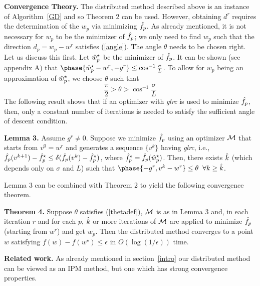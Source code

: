 {\bf Convergence Theory.} The distributed method described above is an instance of Algorithm~\ref{GD} and so Theorem 2 can be used. However, obtaining $d^r$ requires the determination of the $w_p$ via minimizing $\hat{f}_p$. As already mentioned, it is not necessary for $w_p$ to be the minimizer of $\hat{f}_p$; we only need to find $w_p$ such that the direction $d_p=w_p-w^r$ satisfies (\ref{angle}). The angle $\theta$ needs to be chosen right. Let us discuss this first. Let $\hat{w}_p^\star$ be the minimizer of $\hat{f}_p$. It can be shown (see appendix A) that $\phase{\what_p^\star-w^r,-g^r} \le \cos^{-1}\frac{\sigma}{L}$. To allow for $w_p$ being an approximation of $\hat{w}_p^\star$, we choose $\theta$ such that
\begin{equation}
\frac{\pi}{2} > \theta > \cos^{-1} \frac{\sigma}{L}
\label{thetadef}
\end{equation}
The following result shows that if an optimizer with {\it glrc} is used to minimize $\hat{f}_p$, then, only a constant number of iterations is needed to satisfy the sufficient angle of descent condition.

{\bf Lemma 3.} Assume $g^r\not=0$. Suppose we minimize $\hat{f}_p$ using an optimizer ${\cal M}$ that starts from $v^0=w^r$ and generates a sequence $\{v^k\}$ having {\it glrc}, i.e.,
$\hat{f}_p(v^{k+1}) - \hat{f}_p^\star \le \delta (\hat{f}_p(v^k) - \hat{f}_p^\star)$,
where $\hat{f}_p^\star = \hat{f}_p(\hat{w}_p^\star)$. Then, there exists $\hat{k}$ (which depends only on $\sigma$ and $L$) such that
$\phase{-g^r,v^k-w^r} \le \theta \;\; \forall k\ge \khat$.

Lemma 3 can be combined with Theorem 2 to yield the following convergence theorem.

{\bf Theorem 4.} Suppose $\theta$ satisfies (\ref{thetadef}), ${\cal M}$ is as in Lemma 3 and, in each iteration $r$ and for each $p$, $\hat{k}$ or more iterations of ${\cal M}$ are applied to minimize $\hat{f}_p$ (starting from $w^r$) and get $w_p$. Then the distributed method converges to a point $w$ satisfying $f(w)-f(w^\star)\le\epsilon$ in $O(\log(1/\epsilon))$ time.


{\bf Related work.}
As already mentioned in section~\ref{intro} our distributed method can be viewed as an IPM method, but one which has strong convergence properties.

